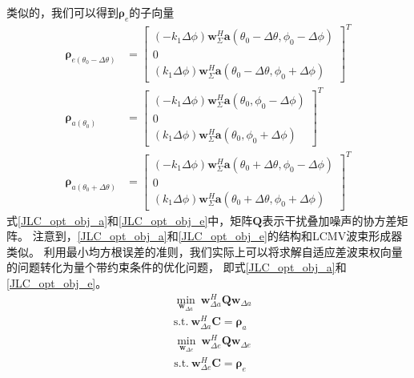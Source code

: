 \documentclass[master]{thesis-uestc}
\begin{document}
类似的，我们可以得到$\bm{\rho}_e$的子向量
\begin{subequations}\label{JLC_sub_cons_vec_e}
    \begin{align}
        \bm{\rho}_{e(\theta_0-\Delta\theta)} &= 
        \begin{bmatrix}
            (-k_1\Delta\phi)\bm{w}^H_\Sigma\bm{a}(\theta_0-\Delta\theta,\phi_0-\Delta\phi) \\
            0 \\
            (k_1\Delta\phi)\bm{w}^H_\Sigma\bm{a}(\theta_0-\Delta\theta,\phi_0+\Delta\phi)
        \end{bmatrix}^T \\
        \bm{\rho}_{a(\theta_0)} &= 
        \begin{bmatrix}
            (-k_1\Delta\phi)\bm{w}^H_\Sigma\bm{a}(\theta_0,\phi_0-\Delta\phi) \\
            0 \\
            (k_1\Delta\phi)\bm{w}^H_\Sigma\bm{a}(\theta_0,\phi_0+\Delta\phi)
        \end{bmatrix}^T \\
        \bm{\rho}_{a(\theta_0+\Delta\theta)} &= 
        \begin{bmatrix}
            (-k_1\Delta\phi)\bm{w}^H_\Sigma\bm{a}(\theta_0+\Delta\theta,\phi_0-\Delta\phi) \\
            0 \\
            (k_1\Delta\phi)\bm{w}^H_\Sigma\bm{a}(\theta_0+\Delta\theta,\phi_0+\Delta\phi)
        \end{bmatrix}^T
    \end{align}
\end{subequations}
式\eqref{JLC_opt_obj_a}和\eqref{JLC_opt_obj_e}中，矩阵$\bm{Q}$表示干扰叠加噪声的协方差矩阵。
注意到，\eqref{JLC_opt_obj_a}和\eqref{JLC_opt_obj_e}的结构和LCMV波束形成器类似。
利用最小均方根误差的准则，我们实际上可以将求解自适应差波束权向量的问题转化为量个带约束条件的优化问题，
即式\eqref{JLC_opt_obj_a}和\eqref{JLC_opt_obj_e}。
\begin{equation}\label{JLC_opt_obj_a}
    \begin{aligned}
        &\min_{\bm{w}_{\Delta a}} ~ \bm{w}_{\Delta a}^H\bm{Q}\bm{w}_{\Delta a} \\
        &\text{s.t.} ~ \bm{w}_{\Delta a}^H\bm{C} = \bm{\rho}_a
    \end{aligned}
\end{equation}
\begin{equation}\label{JLC_opt_obj_e}
    \begin{aligned}
        &\min_{\bm{w}_{\Delta e}} ~ \bm{w}_{\Delta e}^H\bm{Q}\bm{w}_{\Delta e} \\
        &\text{s.t.} ~ \bm{w}_{\Delta e}^H\bm{C} = \bm{\rho}_e
    \end{aligned}
\end{equation}
\end{document}
